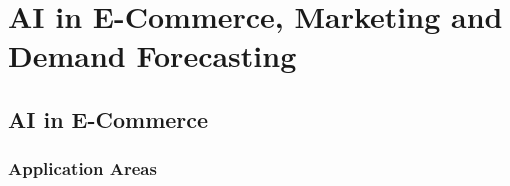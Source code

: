 \chapter{AI in E-Commerce, Marketing and Demand Forecasting}

\section{AI in E-Commerce}

\subsection{Application Areas}

